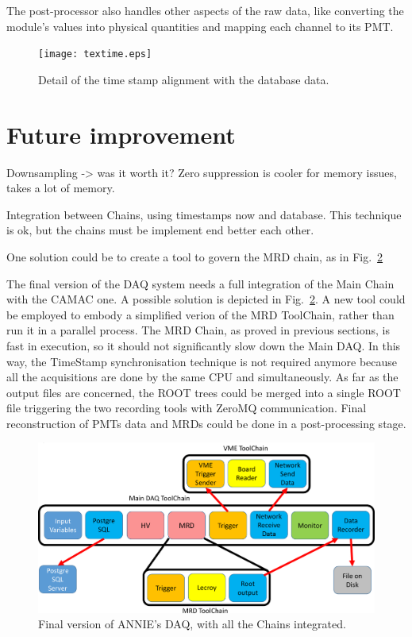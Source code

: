 The post-processor also handles other aspects of the raw data, like converting the module's values %
into physical quantities and mapping each channel to its PMT.

\begin{figure}
  \centering
  \texttt{[image: textime.eps]}
  \caption{Detail of the time stamp alignment with the database data.}
  \label{fig:tdcpost}
\end{figure}

\section{Future improvement}
\label{sec:3.3}
{
\color{red}
Downsampling -> was it worth it?
Zero suppression is cooler for memory issues, takes a lot of memory.

Integration between Chains, using timestamps now and database.
This technique is ok, but the chains must be implement end better each other.

One solution could be to create a tool to govern the MRD chain, as in Fig.~\ref{fig:daqcomplete}
}

The final version of the DAQ system needs a full integration of the Main Chain with the %
CAMAC one.
A possible solution is depicted in Fig.~\ref{fig:daqcomplete}.
A new tool could be employed to embody a simplified verion of the MRD ToolChain, rather than %
run it in a parallel process.
The MRD Chain, as proved in previous sections, is fast in execution, so it should not %
significantly slow down the Main DAQ.
In this way, the TimeStamp synchronisation technique is not required anymore because all the %
acquisitions are done by the same CPU and simultaneously.
As far as the output files are concerned, the ROOT trees could be merged into a single ROOT file %
triggering the two recording tools with ZeroMQ communication.
Final reconstruction of PMTs data and MRDs could be done in a post-processing stage.

\begin{figure}[]
  \centering
  \includegraphics[scale=0.17]{pics/pag5richardshkmeeting}
  \caption{Final version of ANNIE's DAQ, with all the Chains integrated.}
  \label{fig:daqcomplete}
\end{figure}


